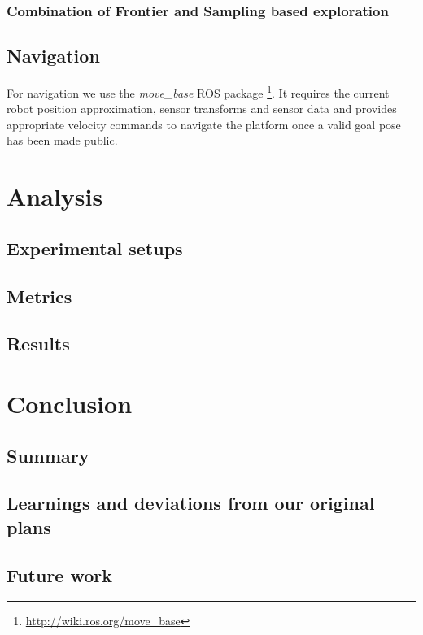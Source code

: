 \documentclass[a4paper,11pt,english]{article}
\begin{document}
\subsubsection{Combination of Frontier and Sampling based exploration}

\subsection{Navigation}
For navigation we use the \textit{move\_base} ROS package \footnote{\url{http://wiki.ros.org/move_base}}.
It requires the current robot position approximation, sensor transforms and sensor data and provides appropriate velocity commands to navigate the platform once a valid goal pose has been made public.

\section{Analysis}
\label{Analysis}

\subsection{Experimental setups}
\subsection{Metrics}
\subsection{Results}

\section{Conclusion}
\label{Conclusion}

\subsection{Summary}
\subsection{Learnings and deviations from our original plans}
\subsection{Future work}

\newpage


\end{document}
